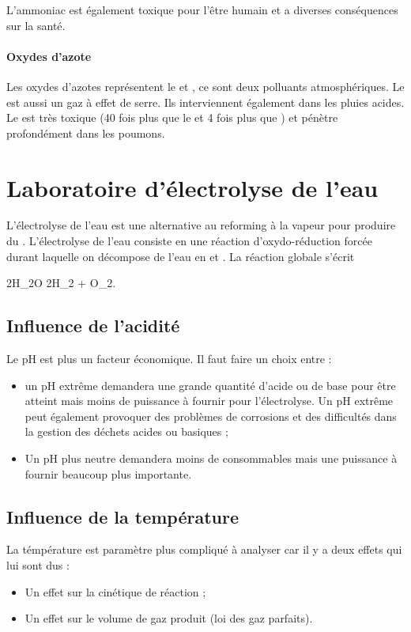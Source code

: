 L'ammoniac est également toxique pour l'être humain et a
diverses conséquences sur la santé.
\paragraph{Oxydes d'azote} Les oxydes d'azotes 
représentent le  et , ce sont
deux polluants atmosphériques. Le  est aussi
un gaz à effet de serre. Ils interviennent également
dans les pluies acides.
Le  est très toxique (40 fois plus que le
 et 4 fois plus que ) et
pénètre profondément dans les poumons.

\section{Laboratoire d'électrolyse de l'eau}
L'électrolyse de l'eau est une alternative au reforming
à la vapeur pour produire du .
L'électrolyse de l'eau consiste en une réaction
d'oxydo-réduction forcée durant laquelle on
décompose de l'eau en  et .
La réaction globale s'écrit 
\begin{chemmath}
	2H_2O \Leftrightarrow 2H_2 + O_2.
\end{chemmath}

\subsection{Influence de l'acidité}
Le pH est plus un facteur économique. Il faut faire un choix
entre :
\begin{itemize}
	\item un pH extrême demandera une grande quantité d'acide
	ou de base pour être atteint mais moins de puissance à fournir pour
	l'électrolyse. Un pH extrême peut également provoquer des
	problèmes de corrosions et des difficultés dans la gestion
	des déchets acides ou basiques ;
	\item Un pH plus neutre demandera moins de consommables mais
	une puissance à fournir beaucoup plus importante.
\end{itemize}
\subsection{Influence de la température}
La témpérature est paramètre plus compliqué à analyser car
il y a deux effets qui lui sont dus :
\begin{itemize}
	\item Un effet sur la cinétique de réaction ;
	\item Un effet sur le volume de gaz produit (loi des gaz parfaits).
\end{itemize}

